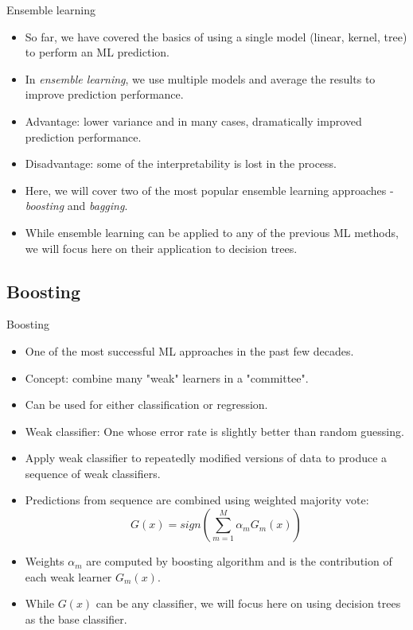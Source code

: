 \documentclass{beamer}
\begin{document}
\begin{frame}{Ensemble learning}
    \begin{itemize}
        \item So far, we have covered the basics of using a single model (linear, kernel, tree) to perform an ML prediction.
        \item In \textit{ensemble learning}, we use multiple models and average the results to improve prediction performance.
        \item Advantage: lower variance and in many cases, dramatically improved prediction performance.
        \item Disadvantage: some of the interpretability is lost in the process.
        \item Here, we will cover two of the most popular ensemble learning approaches - \textit{boosting} and \textit{bagging}.
        \item While ensemble learning can be applied to any of the previous ML methods, we will focus here on their application to decision trees.
    \end{itemize}
\end{frame}


\subsection{Boosting}


\begin{frame}{Boosting}
    \begin{itemize}
        \item One of the most successful ML approaches in the past few decades.
        \item Concept: combine many "weak" learners in a "committee".
        \item Can be used for either classification or regression.
        \item Weak classifier: One whose error rate is slightly better than random guessing.
        \item Apply weak classifier to repeatedly modified versions of data to produce a sequence of weak classifiers.
        \item Predictions from sequence are combined using weighted majority vote:
        \begin{equation*}
            G(x) = sign\left( \sum_{m=1}^M \alpha_mG_m(x)\right)
        \end{equation*}
        \item Weights $\alpha_m$ are computed by boosting algorithm and is the contribution of each weak learner $G_m(x)$.
        \item While $G(x)$ can be any classifier, we will focus here on using decision trees as the base classifier.
    \end{itemize}
\end{frame}
\end{document}
